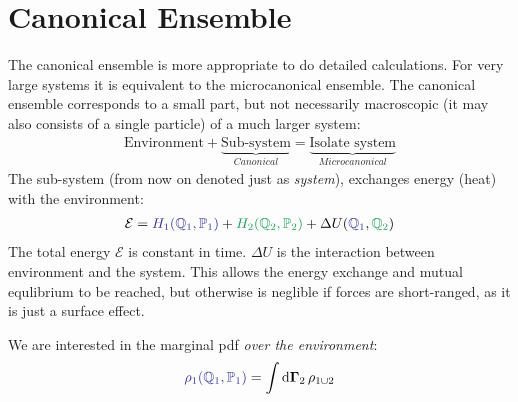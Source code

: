 \documentclass[../../main.tex]{subfiles}
\begin{document}
\section{Canonical Ensemble}
The canonical ensemble is more appropriate to do detailed calculations. For very large systems it is equivalent to the microcanonical ensemble. The canonical ensemble corresponds to a small part, but not necessarily macroscopic (it may also consists of a single particle) of a much larger system:
\begin{align*}
    \text{Environment} + \underbrace{\text{Sub-system}}_{\textit{Canonical}}  = \underbrace{\text{Isolate system}}_{\textit{Microcanonical} } 
\end{align*}
The sub-system (from now on denoted just as \textit{system}), exchanges energy (heat) with the environment:
\begin{align*}
    \mathcal{E} = \textcolor{Blue}{H_1(\mathbb{Q}_1, \mathbb{P}_1)} + \textcolor{ForestGreen}{H_2(\mathbb{Q}_2, \mathbb{P}_2)} + \Delta U(\textcolor{Blue}{\mathbb{Q}_1}, \textcolor{ForestGreen}{\mathbb{Q}_2})
\end{align*}
The total energy $\mathcal{E}$ is constant in time. $\Delta U$ is the interaction between environment and the system. This allows the energy exchange and mutual equlibrium to be reached, but otherwise is neglible if forces are short-ranged, as it is just a surface effect. 

\medskip

We are interested in the marginal pdf \textit{over the environment}:
\begin{align*}
    \textcolor{Blue}{\rho_1(\mathbb{Q}_1,\mathbb{P}_1)} = \int \dd{\bm{\Gamma}_2} \rho_{1 \cup 2}
\end{align*}

\end{document}
